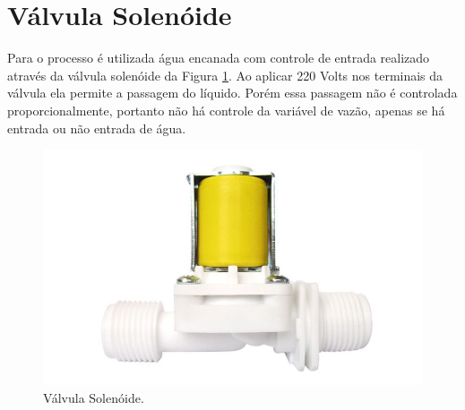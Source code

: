 		\section{Válvula Solenóide}
Para o processo é utilizada água encanada com controle de entrada realizado através da válvula solenóide da Figura \ref{Solenoide}. Ao aplicar 220 Volts nos terminais da válvula ela permite a passagem do líquido. Porém essa passagem não é controlada proporcionalmente, portanto não há controle da variável de vazão, apenas se há entrada ou não entrada de água. 
\begin{figure}[htb]
	\caption{\label{Solenoide}Válvula Solenóide.}
	\begin{center}
	    \includegraphics[width=0.45\linewidth]{./img/Solenoide.jpg}
	\end{center}
\end{figure}
